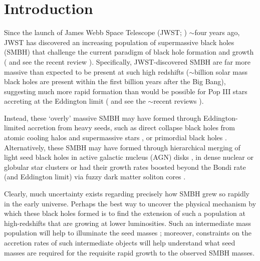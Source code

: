 \documentclass[utf8]{FrontiersinHarvard} %
\begin{document}
\section{Introduction}
Since the launch of James Webb Space Telescope (JWST; \citealt{gardner2023james,mcelwain2023james}) $\sim$four years ago, JWST has discovered an increasing population of supermassive black holes (SMBH) that challenge the current paradigm of black hole formation and growth (\citealt{jacak2025possible} and see the recent review \citealt{harikane2025early}). 
Specifically, JWST-discovered SMBH are far more massive than expected to be present at such high redshifts ($\sim$billion solar mass black holes are present within the first billion years after the Big Bang), suggesting much more rapid formation than would be possible for Pop III stars accreting at the Eddington limit (\citealt{kiyuna2025super} and see the $\sim$recent reviews \citealt{inayoshi2020assembly,volonteri2021origins,jeon2025physical}). 

Instead, these `overly' massive SMBH may have formed through Eddington-limited accretion from heavy seeds, 
such as
direct collapse black holes from atomic cooling halos and supermassive stars \citep{kiyuna2024sequential,lu2024direct,jeon2025little}, 
or primordial black holes \citep{delos2024structure,riotto2025future,carr2025history}. 
Alternatively, these SMBH may have formed through hierarchical merging of light seed black holes in active galactic nucleus (AGN) disks \citep{vaccaro2024impact}, in dense nuclear or globular star clusters \citep{kritos2025supermassive,lahen2025mergers} or had their growth rates boosted beyond the Bondi rate (and Eddington limit) via fuzzy dark matter soliton cores \citep{chiu2025boosting}. 

Clearly, much uncertainty exists regarding precisely how SMBH grew so rapidly in the early universe. Perhaps the best way to uncover the physical mechanism by which these black holes formed is to find the extension of such a population at high-redshifts that are growing at lower luminosities. Such an intermediate mass population will help to illuminate the seed masses \citep{akins2025cosmos}; moreover, constraints on the accretion rates of such intermediate objects will help understand what seed masses are required for the requisite rapid growth to the observed SMBH masses.
\end{document}
